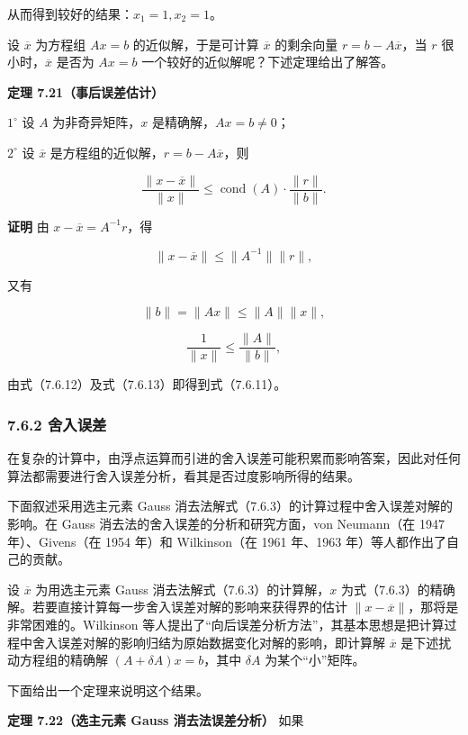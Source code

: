 \documentclass[
  10pt,
  fontset=fandol]{ctexart}
\begin{document}
从而得到较好的结果：\(x_1=1,x_2=1\)。

设 \(\overline x\) 为方程组 \(Ax=b\) 的近似解，于是可计算 \(\overline x\) 的剩余向量 \(r=b-A\overline x\)，当 \(r\) 很小时，\(\overline x\) 是否为 \(Ax=b\) 一个较好的近似解呢？下述定理给出了解答。

\textbf{定理 7.21（事后误差估计）}

\(1^\circ\) 设 \(A\) 为非奇异矩阵，\(x\) 是精确解，\(Ax=b\neq0\)；

\(2^\circ\) 设 \(\overline x\) 是方程组的近似解，\(r=b-A\overline x\)，则

\[
\frac{\|x-\overline x\|}{\|x\|}\leqslant\operatorname{cond}(A)\cdot\frac{\|r\|}{\|b\|}.
\tag{7.6.11}
\]

\textbf{证明} 由 \(x-\overline x=A^{-1}r\)，得

\[
\|x-\overline x\|\leqslant\|A^{-1}\|\|r\|,
\tag{7.6.12}
\]

又有

\[
\|b\|=\|Ax\|\leqslant\|A\|\|x\|,
\]

\[
\frac1{\|x\|}\leqslant\frac{\|A\|}{\|b\|},
\tag{7.6.13}
\]

由式（7.6.12）及式（7.6.13）即得到式（7.6.11）。

\subsubsection{7.6.2 舍入误差}\label{ux820dux5165ux8befux5dee}

在复杂的计算中，由浮点运算而引进的舍入误差可能积累而影响答案，因此对任何算法都需要进行舍入误差分析，看其是否过度影响所得的结果。

下面叙述采用选主元素 Gauss 消去法解式（7.6.3）的计算过程中舍入误差对解的影响。在 Gauss 消去法的舍入误差的分析和研究方面，von Neumann（在 1947 年）、Givens（在 1954 年）和 Wilkinson（在 1961 年、1963 年）等人都作出了自己的贡献。

设 \(\overline x\) 为用选主元素 Gauss 消去法解式（7.6.3）的计算解，\(x\) 为式（7.6.3）的精确解。若要直接计算每一步舍入误差对解的影响来获得界的估计 \(\|x-\overline x\|\)，那将是非常困难的。Wilkinson 等人提出了``向后误差分析方法''，其基本思想是把计算过程中舍入误差对解的影响归结为原始数据变化对解的影响，即计算解 \(\overline x\) 是下述扰动方程组的精确解 \((A+\delta A)x=b\)，其中 \(\delta A\) 为某个``小''矩阵。

下面给出一个定理来说明这个结果。

\textbf{定理 7.22（选主元素 Gauss 消去法误差分析）} 如果
\end{document}
